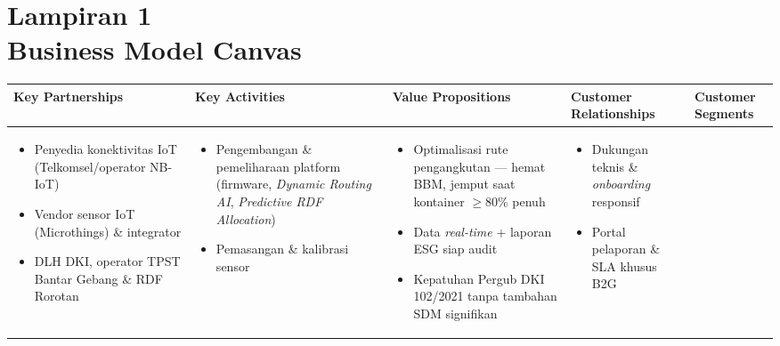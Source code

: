 \section*{Lampiran 1\\Business Model Canvas}

\begin{table}
\centering
\renewcommand{\arraystretch}{1.0}
\footnotesize
\begin{tabularx}{0.92\textheight}{|>{\RaggedRight\arraybackslash}X|>{\RaggedRight\arraybackslash}X|>{\RaggedRight\arraybackslash}X|>{\RaggedRight\arraybackslash}X|>{\RaggedRight\arraybackslash}X|}
\hline
\textbf{Key Partnerships} & \textbf{Key Activities} & \textbf{Value Propositions} & \textbf{Customer Relationships} & \textbf{Customer Segments} \\
\hline
\begin{itemize}[leftmargin=*,topsep=1pt,itemsep=1pt]
  \item Penyedia konektivitas IoT (Telkomsel/operator NB-IoT)
  \item Vendor sensor IoT (Microthings) \& integrator
  \item DLH DKI, operator TPST Bantar Gebang \& RDF Rorotan
\end{itemize}
&
\begin{itemize}[leftmargin=*,topsep=1pt,itemsep=1pt]
  \item Pengembangan \& pemeliharaan platform (firmware, \textit{Dynamic Routing AI}, \textit{Predictive RDF Allocation})
  \item Pemasangan \& kalibrasi sensor
\end{itemize}
&
\begin{itemize}[leftmargin=*,topsep=1pt,itemsep=1pt]
  \item Optimalisasi rute pengangkutan --- hemat BBM, jemput saat kontainer $\geq$80\% penuh
  \item Data \textit{real-time} + laporan ESG siap audit
  \item Kepatuhan Pergub DKI 102/2021 tanpa tambahan SDM signifikan
\end{itemize}
&
\begin{itemize}[leftmargin=*,topsep=1pt,itemsep=1pt]
  \item Dukungan teknis \& \textit{onboarding} responsif
  \item Portal pelaporan \& SLA khusus B2G
\end{itemize}
&
\begin{itemize}[leftmargin=*,topsep=1pt,itemsep=1pt]

\end{itemize}
\end{tabularx}
\end{table}

